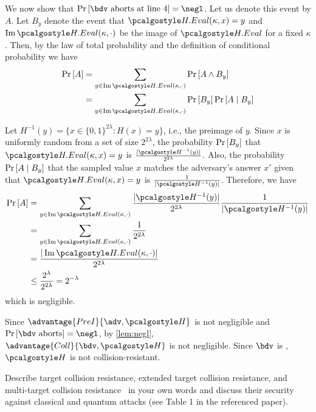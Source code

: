 \begin{mysolution}
  We now show that $\pr{\bdv \text{ aborts at line 4} } = \negl$.
  Let us denote this event by $A$.
  Let $B_y$ denote the event that $\algo{H.Eval}(\kappa, x) = y$ and $\Ima \algo{H.Eval}(\kappa, \cdot)$ be the image of $\algo{H.Eval}$ for a fixed $\kappa$.
  Then, by the law of total probability and the definition of conditional probability we have
  \begin{align*}
    \pr{A} &= \sum_{y \in \Ima \algo{H.Eval}(\kappa, \cdot)} \pr{A \wedge B_y} \\
           &= \sum_{y \in \Ima \algo{H.Eval}(\kappa, \cdot)} \pr{B_y} \pr{A \mid B_y}
  \end{align*}
  
  Let $H^{-1}(y) = \{x \in \{0, 1\}^{2\lambda} : H(x) = y\}$, i.e., the preimage of $y$.
  Since $x$ is uniformly random from a set of size $2^{2\lambda}$, the probability $\Pr\left[ B_y \right]$ that $\algo{H.Eval}(\kappa, x) = y$ is $\frac{|\algo{H}^{-1}(y)|} {2^{2\lambda}}$.
  Also, the probability $\Pr\left[ A \mid B_y \right]$ that the sampled value $x$ matches the adversary's answer $x'$ given that $\algo{H.Eval}(\kappa, x) = y$ is $\frac{1}{|\algo{H}^{-1}(y)|}$.
  Therefore, we have
  \begin{align*}
    \pr{A} &= \sum_{y \in \Ima \algo{H.Eval}(\kappa, \cdot)} \frac{|\algo{H}^{-1}(y)|} {2^{2\lambda}} \frac{1}{|\algo{H}^{-1}(y)|}  \\
           &= \sum_{y \in \Ima \algo{H.Eval}(\kappa, \cdot)} \frac{1} {2^{2\lambda}} \\
           &= \frac{|\Ima \algo{H.Eval}(\kappa, \cdot)|} {2^{2\lambda}} \\
           &\le \frac{2^{\lambda}}{2^{2\lambda}} = 2^{-\lambda} \\
  \end{align*}
  which is negligible.
  
  Since $\advantage{PreI}{\adv, \algo{H}}$ is not negligible and $\pr{\bdv \text{ aborts}} = \negl$, by \cref{lem:negl}, $\advantage{Coll}{\bdv, \algo{H}}$ is not negligible.
  Since $\bdv$ is \ppt, $\algo{H}$ is not collision-resistant.
\end{mysolution}
\fi

\begin{exercise}[Optional]
  Describe target collision resistance, extended target collision resistance, and multi-target collision resistance~\cite{PKC:HulRijSon16} in your own words and discuss their security against classical and quantum attacks (see Table 1 in the referenced paper).
\end{exercise}

